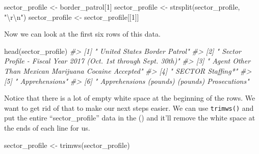 \documentclass[
  12pt,
]{book}
\newenvironment{Shaded}{\begin{snugshade}}{\end{snugshade}}
\newcommand{\CommentTok}[1]{\textcolor[rgb]{0.37,0.37,0.37}{\textit{#1}}}
\newcommand{\DecValTok}[1]{\textcolor[rgb]{0.06,0.06,0.06}{#1}}
\newcommand{\FunctionTok}[1]{\textcolor[rgb]{0,0,0}{#1}}
\newcommand{\NormalTok}[1]{#1}
\newcommand{\OtherTok}[1]{\textcolor[rgb]{0.37,0.37,0.37}{#1}}
\newcommand{\SpecialCharTok}[1]{\textcolor[rgb]{0,0,0}{#1}}
\newcommand{\StringTok}[1]{\textcolor[rgb]{0.5,0.5,0.5}{#1}}
\begin{document}
\begin{Shaded}
\begin{Highlighting}[]
\NormalTok{sector\_profile }\OtherTok{\textless{}{-}}\NormalTok{ border\_patrol[}\DecValTok{1}\NormalTok{]}
\NormalTok{sector\_profile }\OtherTok{\textless{}{-}} \FunctionTok{strsplit}\NormalTok{(sector\_profile, }\StringTok{"}\SpecialCharTok{\textbackslash{}r\textbackslash{}n}\StringTok{"}\NormalTok{)}
\NormalTok{sector\_profile }\OtherTok{\textless{}{-}}\NormalTok{ sector\_profile[[}\DecValTok{1}\NormalTok{]]}
\end{Highlighting}
\end{Shaded}

Now we can look at the first six rows of this data.

\begin{Shaded}
\begin{Highlighting}[]
\FunctionTok{head}\NormalTok{(sector\_profile)}
\CommentTok{\#\textgreater{} [1] "                                                            United States Border Patrol"                                                                       }
\CommentTok{\#\textgreater{} [2] "                                                             Sector Profile {-} Fiscal Year 2017 (Oct. 1st through Sept. 30th)"                                  }
\CommentTok{\#\textgreater{} [3] "                                                  Agent                              Other Than Mexican           Marijuana          Cocaine         Accepted" }
\CommentTok{\#\textgreater{} [4] "              SECTOR                            Staffing*"                                                                                                     }
\CommentTok{\#\textgreater{} [5] "                                                             Apprehensions"                                                                                    }
\CommentTok{\#\textgreater{} [6] "                                                                                       Apprehensions                (pounds)          (pounds)    Prosecutions"}
\end{Highlighting}
\end{Shaded}

Notice that there is a lot of empty white space at the beginning of the rows. We want to get rid of that to make our next steps easier. We can use \texttt{trimws()} and put the entire ``sector\_profile'' data in the () and it'll remove the white space at the ends of each line for us.

\begin{Shaded}
\begin{Highlighting}[]
\NormalTok{sector\_profile }\OtherTok{\textless{}{-}} \FunctionTok{trimws}\NormalTok{(sector\_profile)}
\end{Highlighting}
\end{Shaded}
\end{document}
